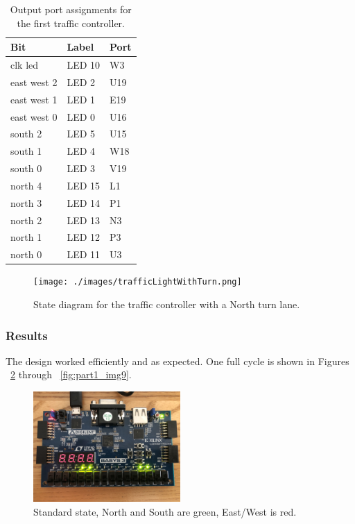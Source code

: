 \documentclass[11pt]{article}
\begin{document}
\begin{table}[H]
\begin{center}
\begin{tabular}{| l | l | l |}
	\hline
	Bit & Label & Port \\ \hline
	clk led & LED 10 & W3 \\ \hline
	east west 2 & LED 2 & U19 \\ \hline
	east west 1 & LED 1 & E19 \\ \hline
	east west 0 & LED 0 & U16 \\ \hline
	south 2 & LED 5 & U15 \\ \hline
	south 1 & LED 4 & W18 \\ \hline
	south 0 & LED 3 & V19 \\ \hline
	north 4 & LED 15 & L1 \\ \hline
	north 3 & LED 14 & P1 \\ \hline
	north 2 & LED 13 & N3 \\ \hline
	north 1 & LED 12 & P3 \\ \hline
	north 0 & LED 11 & U3 \\ \hline
\end{tabular}
\caption{\label{tab:part1_output_Ports}Output port assignments for the first traffic controller.}
\end{center}
\end{table}

\begin{figure}
\begin{center}
	\texttt{[image: ./images/trafficLightWithTurn.png]}
	\caption{\label{fig:part1_state_diagram}State diagram for the traffic controller with a North turn lane.}
\end{center}
\end{figure}

\subsubsection{Results}
The design worked efficiently and as expected. One full cycle is shown in Figures ~\ref{fig:part1_img1} through ~\ref{fig:part1_img9}.

\begin{figure}[H]
\begin{center}
	\includegraphics[width=0.5\textwidth]{./images/Part1/l9p1img1.jpg}
	\caption{\label{fig:part1_img1}Standard state, North and South are green, East/West is red.}
\end{center}
\end{figure}
\end{document}
